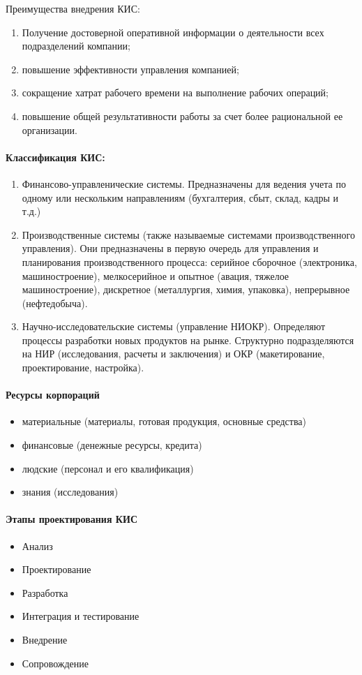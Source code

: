 Преимущества внедрения КИС:
\begin{enumerate}
  \item Получение достоверной оперативной информации о деятельности всех
    подразделений компании;
  \item повышение эффективности управления компанией;
  \item сокращение хатрат рабочего времени на выполнение рабочих операций;
  \item повышение общей результативности работы за счет более рациональной ее
    организации.
\end{enumerate}

\paragraph{Классификация КИС:}\mbox{}\par
\begin{enumerate}
  \item Финансово-управленические системы. Предназначены для ведения учета по
    одному или нескольким направлениям (бухгалтерия, сбыт, склад, кадры и т.д.)
  \item Производственные системы (также называемые системами производственного
    управления). Они предназначены в первую очередь для управления и
    планирования производственного процесса: серийное сборочное (электроника,
    машиностроение), мелкосерийное и опытное (авация, тяжелое машиностроение),
    дискретное (металлургия, химия, упаковка), непрерывное (нефтедобыча).
  \item Научно-исследовательские системы (управление НИОКР). Определяют процессы
    разработки новых продуктов на рынке. Структурно подразделяются на НИР
    (исследования, расчеты и заключения) и ОКР (макетирование, проектирование,
    настройка).
\end{enumerate}

\paragraph{Ресурсы корпораций}\mbox{}\par
\begin{itemize}
  \item материальные (материалы, готовая продукция, основные средства)
  \item финансовые (денежные ресурсы, кредита)
  \item людские (персонал и его квалификация)
  \item знания (исследования)
\end{itemize}

\paragraph{Этапы проектирования КИС}\mbox{}\par
\begin{itemize}
  \item Анализ
  \item Проектирование
  \item Разработка
  \item Интеграция и тестирование
  \item Внедрение
  \item Сопровождение
\end{itemize}
